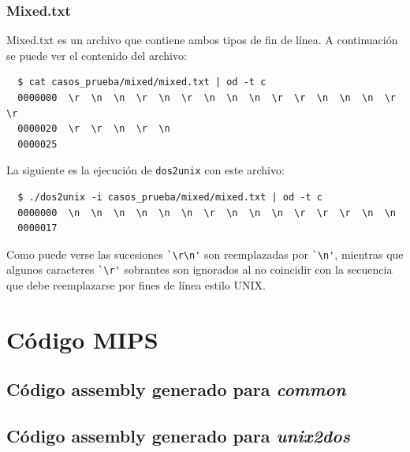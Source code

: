 \documentclass[a4paper,10pt, spanish]{article}
\begin{document}
\subsubsection{Mixed.txt}
Mixed.txt es un archivo que contiene ambos tipos de fin de línea.
A continuación se puede ver el contenido del archivo:
\begin{lstlisting}
  $ cat casos_prueba/mixed/mixed.txt | od -t c
  0000000  \r  \n  \n  \r  \n  \r  \n  \n  \n  \r  \r  \n  \n  \n  \r  \r
  0000020  \r  \r  \n  \r  \n
  0000025
\end{lstlisting}
La siguiente es la ejecución de \lstinline{dos2unix} con este archivo:
\begin{lstlisting}
  $ ./dos2unix -i casos_prueba/mixed/mixed.txt | od -t c
  0000000  \n  \n  \n  \n  \n  \n  \r  \n  \n  \n  \r  \r  \r  \n  \n
  0000017  
\end{lstlisting}
Como puede verse las sucesiones \lstinline{`\r\n'} son reemplazadas por \lstinline{`\n'},
mientras que algunos caracteres \lstinline{`\r'} sobrantes son ignorados al no coincidir
con la secuencia que debe reemplazarse por fines de línea estilo UNIX.


\section{Código MIPS}

\subsection{Código assembly generado para \textit{common}}


\subsection{Código assembly generado para \textit{unix2dos}}

\end{document}
